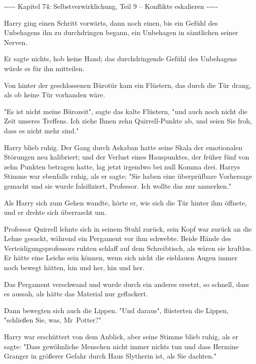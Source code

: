 

\hypertarget{selbstverwirklichung-teil-9-konflikte-eskalieren}{%

-\/-\/-\/-\/- Kapitel 74: Selbstverwirklichung, Teil 9 -- Konflikte eskalieren -\/-\/-\/-\/-

Harry ging einen Schritt vorwärts, dann noch einen, bis ein Gefühl des Unbehagens ihn zu durchdringen begann, ein Unbehagen in sämtlichen seiner Nerven.

Er sagte nichts, hob keine Hand; das durchdringende Gefühl des Unbehagens würde es für ihn mitteilen.

Von hinter der geschlossenen Bürotür kam ein Flüstern, das durch die Tür drang, als ob keine Tür vorhanden wäre.

"Es ist nicht meine Bürozeit", sagte das kalte Flüstern, "und auch noch nicht die Zeit unseres Treffens. Ich ziehe Ihnen zehn Quirrell-Punkte ab, und seien Sie froh, dass es nicht mehr sind."

Harry blieb ruhig. Der Gang durch Askaban hatte seine Skala der emotionalen Störungen neu kalibriert; und der Verlust eines Hauspunktes, der früher fünf von zehn Punkten betragen hatte, lag jetzt irgendwo bei null Komma drei. Harrys Stimme war ebenfalls ruhig, als er sagte: "Sie haben eine überprüfbare Vorhersage gemacht und sie wurde falsifiziert, Professor. Ich wollte das nur anmerken."

Als Harry sich zum Gehen wandte, hörte er, wie sich die Tür hinter ihm öffnete, und er drehte sich überrascht um.

Professor Quirrell lehnte sich in seinem Stuhl zurück, sein Kopf war zurück an die Lehne gesackt, während ein Pergament vor ihm schwebte. Beide Hände des Verteidigungsprofessors ruhten schlaff auf dem Schreibtisch, als wären sie kraftlos. Er hätte eine Leiche sein können, wenn sich nicht die eisblauen Augen immer noch bewegt hätten, hin und her, hin und her.

Das Pergament verschwand und wurde durch ein anderes ersetzt, so schnell, dass es aussah, als hätte das Material nur geflackert.

Dann bewegten sich auch die Lippen. "Und daraus", flüsterten die Lippen, "schließen Sie, was, Mr~Potter?"

Harry war erschüttert von dem Anblick, aber seine Stimme blieb ruhig, als er sagte: "Dass gewöhnliche Menschen nicht immer nichts tun und dass Hermine Granger in größerer Gefahr durch Haus Slytherin ist, als Sie dachten."

}

